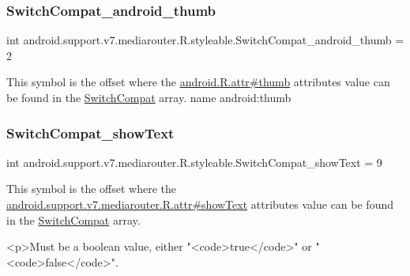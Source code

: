\subsubsection{\texorpdfstring{Switch\+Compat\+\_\+android\+\_\+thumb}{SwitchCompat\_android\_thumb}}
{\footnotesize\ttfamily int android.\+support.\+v7.\+mediarouter.\+R.\+styleable.\+Switch\+Compat\+\_\+android\+\_\+thumb = 2\hspace{0.3cm}{\ttfamily [static]}}

This symbol is the offset where the \hyperlink{}{android.\+R.\+attr\#thumb} attribute\textquotesingle{}s value can be found in the \hyperlink{classandroid_1_1support_1_1v7_1_1mediarouter_1_1R_1_1styleable_af5c7f83276b6c88619833dc8bebeacd9}{Switch\+Compat} array.  name android\+:thumb \mbox{\label{classandroid_1_1support_1_1v7_1_1mediarouter_1_1R_1_1styleable_af24f7da08cafd932e8fb474f0845baf4}} 
\subsubsection{\texorpdfstring{Switch\+Compat\+\_\+show\+Text}{SwitchCompat\_showText}}
{\footnotesize\ttfamily int android.\+support.\+v7.\+mediarouter.\+R.\+styleable.\+Switch\+Compat\+\_\+show\+Text = 9\hspace{0.3cm}{\ttfamily [static]}}

This symbol is the offset where the \hyperlink{classandroid_1_1support_1_1v7_1_1mediarouter_1_1R_1_1attr_a26211d9eb735cfec1338b7c826645ce7}{android.\+support.\+v7.\+mediarouter.\+R.\+attr\#show\+Text} attribute\textquotesingle{}s value can be found in the \hyperlink{classandroid_1_1support_1_1v7_1_1mediarouter_1_1R_1_1styleable_af5c7f83276b6c88619833dc8bebeacd9}{Switch\+Compat} array.

\begin{DoxyVerb}      <p>Must be a boolean value, either "<code>true</code>" or "<code>false</code>".
\end{DoxyVerb}
 

